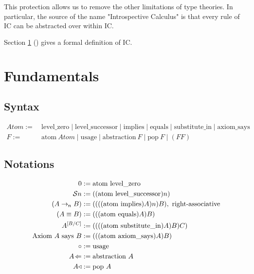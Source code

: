 \documentclass{article}
\begin{document}
  This protection allows us to remove the other limitations of type theories.
  In particular, the source of the name "Introspective Calculus" is that every rule of IC can be abstracted over within IC.



  
  Section \ref{fundamentals} (\textit{}) gives a formal definition of IC.  

  \section{Fundamentals}\label{fundamentals}

  \subsection{Syntax}
  \begin{align*}
     Atom :=&\ \mathrm{level\_zero} \mid \mathrm{level\_successor} \mid \mathrm{implies} \mid \mathrm{equals} \mid \mathrm{substitute\_in} \mid \mathrm{axiom\_says}\\
     F :=&\ \mathrm{atom}\ Atom \mid \mathrm{usage} \mid \mathrm{abstraction}\ F \mid \mathrm{pop}\ F \mid (F F)
  \end{align*}

  \subsection{Notations}
  

  \newcommand{\ic}[1]{#1}
  \newcommand{\abst}[1]{#1\!\Leftarrow}
  \newcommand{\context}[2]{\mlq#1/#2\mrq}
  \newcommand{\variable}[1]{{\mathcal{V}_{\mlq\hspace{-0.06em}#1\hspace{-0.06em}\mrq}}}
  \newcommand{\clocksub}[1]{\text{\clock}_{\!#1}}
  \newcommand{\nameabst}[1]{#1 \Rightarrow}
  \newcommand{\axiom}[2]{\mathrm{Axiom}\ #1\ \mathrm{says}\ #2}
  \newcommand{\axiomatic}[1]{\infty #1}
  \newcommand{\usage}{\circ}
  \newcommand{\pop}[1]{#1\triangleleft}
  \newcommand{\subst}[3]{#1^{[{#2}{/}{#3}]}}

  \begin{align*}
    \lzero &:= \mathrm{atom}\ \mathrm{level\_zero}\\
    \lsucc{n} &:= ((\mathrm{atom}\ \mathrm{level\_successor}) n)\\
    (A \implies{n} B) &:= ((((\mathrm{atom}\ \mathrm{implies}) A) n) B),\ \operatorname{right-associative}\\
    (A \equiv B) &:= (((\mathrm{atom}\ \mathrm{equals}) A) B)\\
    \subst{A}{B}{C} &:= ((((\mathrm{atom}\ \mathrm{substitute\_in}) A) B) C)\\
    \axiom{A}{B} &:= (((\mathrm{atom}\ \mathrm{axiom\_says}) A) B)\\
    \usage &:= \mathrm{usage}\\
    \abst{A} &:= \mathrm{abstraction}\ A\\
    \pop{A} &:= \mathrm{pop}\ A\\
  \end{align*}
\end{document}
